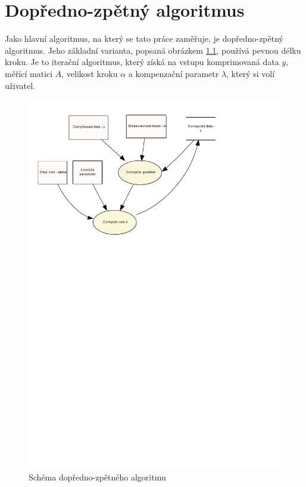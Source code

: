 \documentclass[FM,BP]{tulthesis}
\begin{document}
\chapter{Dopředno-zpětný algoritmus}
\label{ch:fwbw}
Jako hlavní algoritmus, na který se tato práce zaměřuje, je dopředno-zpětný algoritmus. Jeho základní varianta, popsaná obrázkem \ref{fig:fw-bw alg}, používá pevnou délku kroku. Je to iterační algoritmus, který získá na vstupu komprimovaná data $y$, měřící matici $A$, velikost kroku $\alpha$ a kompenzační parametr $\lambda$, který si volí uživatel.
\begin{figure}[!ht]
\begin{center}
\includegraphics[scale=0.75]{obr/forwardbackward.pdf}
\end{center}
\caption{Schéma dopředno-zpětného algoritmu}
\label{fig:fw-bw alg}
\end{figure}
\end{document}
